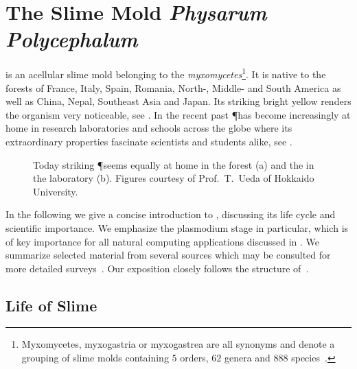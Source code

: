 \section{The Slime Mold \textit{Physarum Polycephalum}}

	\Pp is an acellular slime mold belonging to the \emph{myxomycetes}\footnote{Myxomycetes, myxogastria or myxogastrea are all synonyms and denote a grouping of slime molds containing $5$ orders, $62$ genera and $888$ species~\cite{ainsworth2008ainsworth}.}. It is native to the forests of France, Italy, Spain, Romania, North-, Middle- and South America as well as China, Nepal, Southeast Asia and Japan. Its striking bright yellow renders the organism very noticeable, see . In the recent past \P has become increasingly at home in research laboratories and schools across the globe where its extraordinary properties fascinate scientists and students alike, see .

	\begin{figure}[!htp]
		\centering
		\qquad
		\caption[\P exploring various environments]{Today striking \P seems equally at home in the forest (a) and the in the laboratory (b). Figures courtesy of Prof.~T.~Ueda of Hokkaido University.}
		\label{fig:exploration}
	\end{figure}

	In the following we give a concise introduction to \Pp, discussing its life cycle and scientific importance. We emphasize the plasmodium stage in particular, which is of key importance for all natural computing applications discussed in . We summarize selected material from several sources which may be consulted for more detailed surveys~\cite{stephenson1994myxomycetes,nowotny2000myxomyceten,grube2016physarum,Sauer1986,Mayne2016,howard1931life}. Our exposition closely follows the structure of~\cite{nowotny2000myxomyceten}.
	
	\FloatBarrier
	
	\subsection{Life of Slime}


